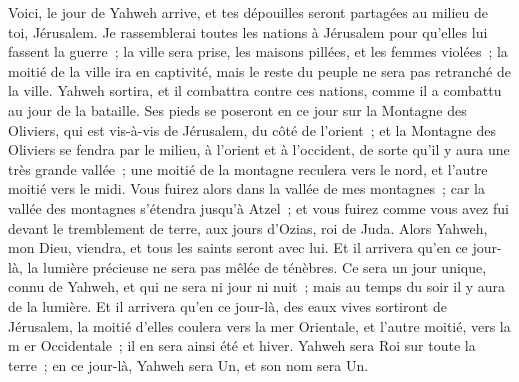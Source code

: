 \begin{multicols}{2}
\VerseOne{}Voici, le jour de Yahweh arrive, et tes dépouilles seront partagées au milieu de toi, Jérusalem.
Je rassemblerai toutes les nations à Jérusalem pour qu'elles lui fassent la guerre~; la ville sera prise, les maisons pillées, et les femmes violées~; la moitié de la ville ira en captivité, mais le reste du peuple ne sera pas retranché de la ville.
Yahweh sortira, et il combattra contre ces nations, comme il a combattu au jour de la bataille.
Ses pieds se poseront en ce jour sur la Montagne des Oliviers, qui est vis-à-vis de Jérusalem, du côté de l'orient~; et la Montagne des Oliviers se fendra par le milieu, à l'orient et à l'occident, de sorte qu'il y aura une très grande vallée~; une moitié de la montagne reculera vers le nord, et l'autre moitié vers le midi.
Vous fuirez alors dans la vallée de mes montagnes~; car la vallée des montagnes s'étendra jusqu'à Atzel~; et vous fuirez comme vous avez fui devant le tremblement de terre, aux jours d'Ozias, roi de Juda. Alors Yahweh, mon Dieu, viendra, et tous les saints seront avec lui.
Et il arrivera qu'en ce jour-là, la lumière précieuse ne sera pas mêlée de ténèbres.
Ce sera un jour unique, connu de Yahweh, et qui ne sera ni jour ni nuit~; mais au temps du soir il y aura de la lumière.
Et il arrivera qu'en ce jour-là, des eaux vives sortiront de Jérusalem, la moitié d'elles coulera vers la mer Orientale, et l'autre moitié, vers la m er Occidentale~; il en sera ainsi été et hiver.
Yahweh sera Roi sur toute la terre~; en ce jour-là, Yahweh sera Un, et son nom sera Un.

\end{multicols}
